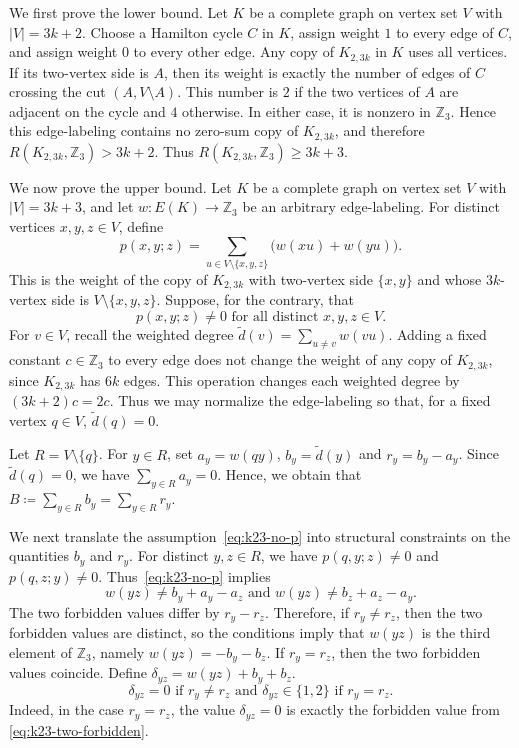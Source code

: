 ﻿\documentclass[11pt]{article}
\numberwithin{equation}{section}
\theoremstyle{remark}
\newcommand{\Z}{\mathbb Z}
\newcommand{\td}{\tilde{d}}
\begin{document}
We first prove the lower bound.  Let $K$ be a complete graph on vertex set $V$ with $|V|=3k+2$.  Choose a Hamilton cycle $C$ in $K$, assign weight $1$ to every edge of $C$, and assign weight $0$ to every other edge.  Any copy of $K_{2,3k}$ in $K$ uses all vertices.  If its two-vertex side is $A$, then its weight is exactly the number of edges of $C$ crossing the cut \((A,V\setminus A)\).  This number is $2$ if the two vertices of $A$ are adjacent on the cycle and $4$ otherwise.  In either case, it is nonzero in $\Z_3$.  Hence this edge-labeling contains no zero-sum copy of \(K_{2,3k}\), and therefore $R(K_{2,3k},\Z_3)>3k+2$. Thus $R(K_{2,3k},\Z_3)\ge3k+3$.

We now prove the upper bound.  Let $K$ be a complete graph on vertex set $V$ with $|V|=3k+3$, and let $w\colon E(K)\to\Z_3$ be an arbitrary edge-labeling.  For distinct vertices $x,y,z\in V$, define
\[
    p(x,y;z)=\sum_{u\in V\setminus\{x,y,z\}}\bigl(w(xu)+w(yu)\bigr).
\]
This is the weight of the copy of $K_{2,3k}$ with two-vertex side $\{x,y\}$ and whose \(3k\)-vertex side is $V\setminus\{x,y,z\}$.  Suppose, for the contrary, that
\begin{equation}\label{eq:k23-no-p}
    p(x,y;z)\ne0\text{ for all distinct }x,y,z\in V.
\end{equation}
For $v\in V$, recall the weighted degree $\td(v)=\sum_{u\ne v}w(vu)$.  Adding a fixed constant $c\in\Z_3$ to every edge does not change the weight of any copy of  $K_{2,3k}$, since $K_{2,3k}$ has $6k$ edges.  This operation changes each weighted degree by $(3k+2)c=2c$.  Thus we may normalize the edge-labeling so that, for a fixed vertex \(q\in V\), $\td(q)=0$.

Let $R=V\setminus\{q\}$.  For $y\in R$, set $a_y=w(qy)$, $b_y=\td(y)$ and $r_y=b_y-a_y$.
Since $\td(q)=0$, we have $\sum_{y\in R}a_y=0$.  Hence, we obtain that $B\coloneqq\sum_{y\in R}b_y=\sum_{y\in R}r_y$.

We next translate the assumption~\eqref{eq:k23-no-p} into structural constraints on the quantities \(b_y\) and \(r_y\).
For distinct $y,z\in R$, we have $p(q,y;z)\ne0$ and $p(q,z;y)\ne0$. Thus~\eqref{eq:k23-no-p} implies
\begin{equation}\label{eq:k23-two-forbidden}
    w(yz)\ne b_y+a_y-a_z\text{ and }w(yz)\ne b_z+a_z-a_y.
\end{equation}
The two forbidden values differ by $r_y-r_z$.  Therefore, if $r_y\ne r_z$, then the two forbidden values are distinct, so the conditions imply that \(w(yz)\) is the third element of \(\Z_3\), namely $w(yz)=-b_y-b_z$.  If $r_y=r_z$, then the two forbidden values coincide. Define $\delta_{yz}=w(yz)+b_y+b_z$.
\begin{equation}\label{eq:k23-delta-type}
    \delta_{yz}=0\text{ if }r_y\ne r_z\text{ and }\delta_{yz}\in\{1,2\}\text{ if }r_y=r_z.
\end{equation}
Indeed, in the case \(r_y=r_z\), the value \(\delta_{yz}=0\) is exactly the forbidden value from \eqref{eq:k23-two-forbidden}.
\end{document}
